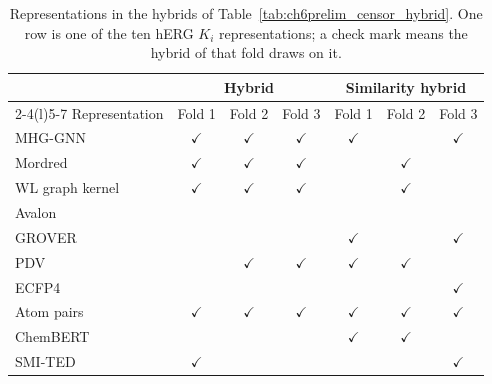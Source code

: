 \begin{table}[htbp]
\centering
\small
\begin{tabular}{@{}lcccccc@{}}
\toprule
 & \multicolumn{3}{c}{Hybrid} & \multicolumn{3}{c}{Similarity hybrid} \\
\cmidrule(lr){2-4}\cmidrule(l){5-7}
Representation & Fold 1 & Fold 2 & Fold 3 & Fold 1 & Fold 2 & Fold 3 \\
\midrule
MHG-GNN & $\checkmark$ & $\checkmark$ & $\checkmark$ & $\checkmark$ & & $\checkmark$ \\
Mordred & $\checkmark$ & $\checkmark$ & $\checkmark$ & & $\checkmark$ & \\
WL graph kernel & $\checkmark$ & $\checkmark$ & $\checkmark$ & & $\checkmark$ & \\
Avalon & & & & & & \\
GROVER & & & & $\checkmark$ & & $\checkmark$ \\
PDV & & $\checkmark$ & $\checkmark$ & $\checkmark$ & $\checkmark$ & \\
ECFP4 & & & & & & $\checkmark$ \\
Atom pairs & $\checkmark$ & $\checkmark$ & $\checkmark$ & $\checkmark$ & $\checkmark$ & $\checkmark$ \\
ChemBERT & & & & $\checkmark$ & $\checkmark$ & \\
SMI-TED & $\checkmark$ & & & & & $\checkmark$ \\
\bottomrule
\end{tabular}
\caption[Representations in the hybrids of the clipped-label experiment]{Representations in the hybrids of Table~\ref{tab:ch6prelim_censor_hybrid}. One row is one of the ten hERG $K_i$ representations; a check mark means the hybrid of that fold draws on it.}
\label{tab:ch6prelim_censor_reps}
\end{table}


